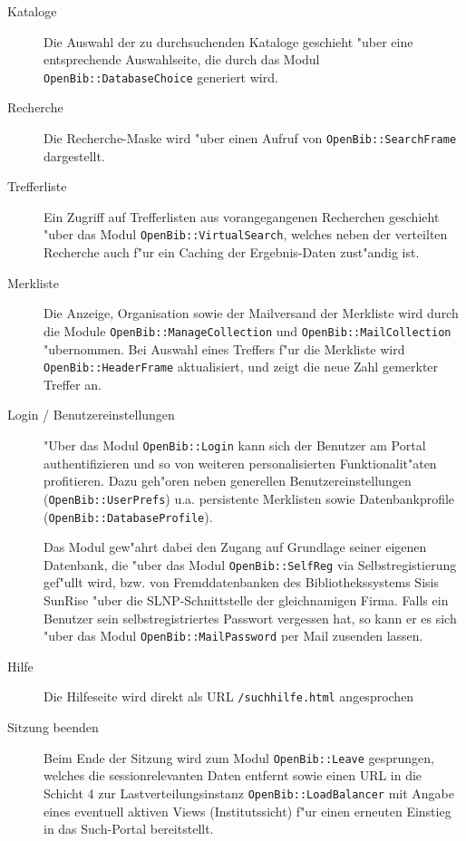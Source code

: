 \documentclass[11pt, twoside, a4paper, BCOR8mm, DIV12, bibtotoc,idxtotoc]{scrbook}
\begin{document}
\begin{description}
\item[Kataloge] Die Auswahl der zu durchsuchenden Kataloge geschieht
  "uber eine entsprechende Aus\-wahl\-seite, die durch das Modul
  \texttt{OpenBib::DatabaseChoice} generiert wird.
\item[Recherche] Die Recherche-Maske wird "uber einen Aufruf von
  \texttt{OpenBib::SearchFrame} dargestellt.
\item[Trefferliste] Ein Zugriff auf Trefferlisten aus vorangegangenen
  Recherchen geschieht "uber das Modul \texttt{OpenBib::VirtualSearch},
  welches neben der verteilten Recherche auch f"ur ein Caching der
  Ergebnis-Daten zust"andig ist.
\item[Merkliste] Die Anzeige, Organisation sowie der Mailversand der
  Merkliste wird durch die Module
  \texttt{OpenBib::ManageCollection} und \texttt{OpenBib::MailCollection}
  "uber\-nom\-men. Bei Auswahl eines Treffers f"ur die Merkliste wird
  \texttt{OpenBib::HeaderFrame} aktualisiert, und zeigt die neue Zahl
  gemerkter Treffer an.
\item[Login / Benutzereinstellungen] "Uber das Modul \texttt{OpenBib::Login}
  kann sich der Benutzer am Portal authentifizieren und so von
  weiteren personalisierten Funktionalit"aten profitieren. Dazu
  geh"oren neben generellen Benutzereinstellungen
  (\texttt{OpenBib::UserPrefs}) u.a. per\-sis\-ten\-te Merklisten sowie
  Datenbankprofile (\texttt{OpenBib::DatabaseProfile}).

  Das Modul gew"ahrt dabei den Zugang auf Grundlage seiner eigenen
  Datenbank, die "uber das Modul \texttt{OpenBib::SelfReg} via
  Selbstregistierung gef"ullt wird, bzw. von Fremddatenbanken des
  Bibliothekssystems Sisis SunRise "uber die SLNP-Schnittstelle der
  gleichnamigen Firma. Falls ein Benutzer sein selbstregistriertes
  Passwort vergessen hat, so kann er es sich "uber das Modul
  \texttt{OpenBib::MailPassword} per Mail zusenden lassen.
\item[Hilfe] Die Hilfeseite wird direkt als URL
  \texttt{/suchhilfe.html} angesprochen
\item[Sitzung beenden] Beim Ende der Sitzung wird zum Modul
  \texttt{OpenBib::Leave} gesprungen, welches die sessionrelevanten Daten
  entfernt sowie einen URL in die Schicht 4 zur Lastver\-teilungs\-instanz
  \texttt{OpenBib::LoadBalancer} mit Angabe eines eventuell aktiven Views
  (Institutssicht) f"ur einen er\-neu\-ten Einstieg in das Such-Portal
  bereitstellt.

\end{description}
\end{document}
